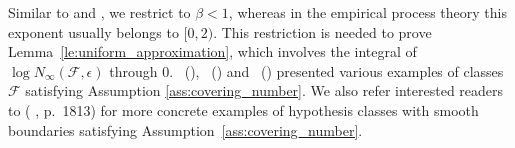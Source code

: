 \documentclass[letterpaper]{article} %
\newcommand{\complexbound}{\beta}
\newcommand{\red}[1]{\textcolor{red}{#1}}
\newcommand{\todo}[1]{\red{\textsc{todo:} #1}}
\newcommand{\citet}[1]{\citeauthor{#1}\ (\citeyear{#1})}
\begin{document}
Similar to \cite{Massart2006} and \cite{rejchel2012ranking}, we restrict to $\complexbound{} < 1$, whereas in the empirical process theory this exponent usually belongs to $[0,2)$. This restriction is needed to prove Lemma~\ref{le:uniform_approximation}, which involves the integral of $\log N_\infty(\mathcal{F},\epsilon)$ through $0$. 
\citet{Dudley1974Metric}, \citet{Korostelev1993Minimax} and \citet{Mammen1995Asymptotical} presented various examples of classes $\mathcal{F}$ satisfying Assumption \ref{ass:covering_number}.
We also refer interested readers to (\citeauthor{Mammen1998Smooth} \citeyear{Mammen1998Smooth}, p.\ 1813) for more concrete examples of hypothesis classes with smooth boundaries satisfying Assumption~\ref{ass:covering_number}. 
\end{document}
